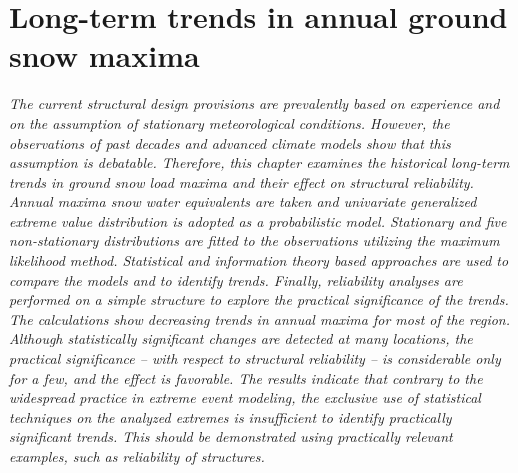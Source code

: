 \chapter{Long-term trends in annual ground snow maxima}
\label{cha:time_trend}

\ifpdf
    \graphicspath{{Chapter5/Figs/Raster/}{Chapter5/Figs/PDF/}{Chapter5/Figs/}}
\else
    \graphicspath{{Chapter5/Figs/Vector/}{Chapter5/Figs/}}
\fi

\leftskip=1cm
\noindent
\emph{The current structural design provisions are prevalently based on experience and on the assumption of stationary meteorological conditions. However, the observations of past decades and advanced climate models show that this assumption is debatable. Therefore, this chapter examines the historical long-term trends in ground snow load maxima and their effect on structural reliability. Annual maxima snow water equivalents are taken and univariate generalized extreme value distribution is adopted as a probabilistic model. Stationary and five non-stationary distributions are fitted to the observations utilizing the maximum likelihood method. Statistical and information theory based approaches are used to compare the models and to identify trends. Finally, reliability analyses are performed on a simple structure to explore the practical significance of the trends. The calculations show decreasing trends in annual maxima for most of the region. Although statistically significant changes are detected at many locations, the practical significance -- with respect to structural reliability -- is considerable only for a few, and the effect is favorable. The results indicate that contrary to the widespread practice in extreme event modeling, the exclusive use of statistical techniques on the analyzed extremes is insufficient to identify practically significant trends. This should be demonstrated using practically relevant examples, such as reliability of structures.}

\leftskip=0pt\rightskip=0pt


